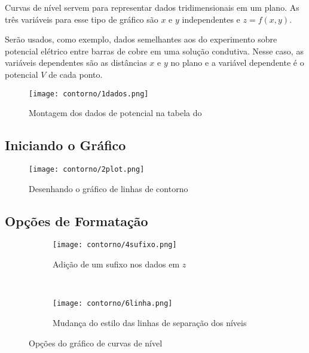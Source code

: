 Curvas de nível servem para representar dados tridimensionais em um plano. As três variáveis para esse tipo de gráfico são $x$ e $y$ independentes e $z = f(x,y)$.

Serão usados, como exemplo, dados semelhantes aos do experimento sobre potencial elétrico entre barras de cobre em uma solução condutiva. Nesse caso, as variáveis dependentes são as distâncias $x$ e $y$ no plano e a variável dependente é o potencial $V$ de cada ponto.

\begin{figure}[htbp]
    \centering
    \texttt{[image: contorno/1dados.png]}

    \caption{Montagem dos dados de potencial na tabela do \software}
    \label{fig:contorno:dados}
\end{figure}


\subsection{Iniciando o Gráfico}

    \begin{figure}[htbp]
        \centering
        \texttt{[image: contorno/2plot.png]}

        \caption{Desenhando o gráfico de linhas de contorno}
        \label{fig:contorno:plot}
    \end{figure}

\subsection{Opções de Formatação}

    \begin{figure}[H]
        \centering
        \begin{subfigure}{0.7\textwidth}
            \centering
            \texttt{[image: contorno/4sufixo.png]}

            \caption{Adição de um sufixo nos dados em $z$}
            \label{fig:contorno:sufixo}
        \end{subfigure}
        ~
        \begin{subfigure}{0.7\textwidth}
            \centering
            \texttt{[image: contorno/6linha.png]}

            \caption{Mudança do estilo das linhas de separação dos níveis}
            \label{fig:contorno:linhas}
        \end{subfigure}
        \caption{Opções do gráfico de curvas de nível}
        \label{fig:contorno:opcoes}
    \end{figure}

